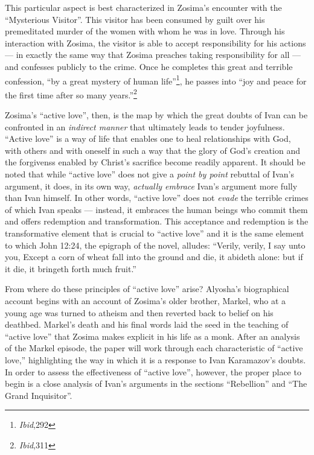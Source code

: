 This particular aspect is best characterized in Zosima's encounter with the ``Mysterious Visitor''. This visitor has been consumed by guilt over his premeditated murder of the women with whom he was in love. Through his interaction with Zosima, the visitor is able to accept responsibility for his actions --- in exactly the same way that Zosima preaches taking responsibility for all --- and confesses publicly to the crime. Once he completes this great and terrible confession, ``by a great mystery of human life''\footnote{\emph{Ibid},292}, he passes into ``joy and peace for the first time after so many years.''\footnote{\emph{Ibid},311}  

Zosima's ``active love'', then, is the map by which the great doubts of Ivan can be confronted in an \emph{indirect manner} that ultimately leads to tender joyfulness. ``Active love'' is a way of life that enables one to heal relationships with God, with others and with oneself in such a way that the glory of God's creation and the forgivenss enabled by Christ's sacrifice become readily apparent. It should be noted that while ``active love'' does not give a \emph{point by point} rebuttal of Ivan's argument, it does, in its own way, \emph{actually embrace} Ivan's argument more fully than Ivan himself. In other words, ``active love'' does not \emph{evade} the terrible crimes of which Ivan speaks --- instead, it embraces the human beings who commit them and offers redemption and transformation. This acceptance and redemption is the transformative element that is crucial to ``active love'' and it is the same element to which John 12:24, the epigraph of the novel, alludes: ``Verily, verily, I say unto you, Except a corn of wheat fall into the ground and die, it abideth alone: but if it die, it bringeth forth much fruit.''

From where do these principles of ``active love'' arise? Alyosha's biographical account begins with an account of Zosima's older brother, Markel, who at a young age was turned to atheism and then reverted back to belief on his deathbed. Markel's death and his final words laid the seed in the teaching of ``active love'' that Zosima makes explicit in his life as a monk. After an analysis of the Markel episode, the paper will work through each characteristic of ``active love,'' highlighting the way in which it is a response to Ivan Karamazov's doubts. In order to assess the effectiveness of ``active love'', however, the proper place to begin is a close analysis of Ivan's arguments in the sections ``Rebellion'' and ``The Grand Inquisitor''.

